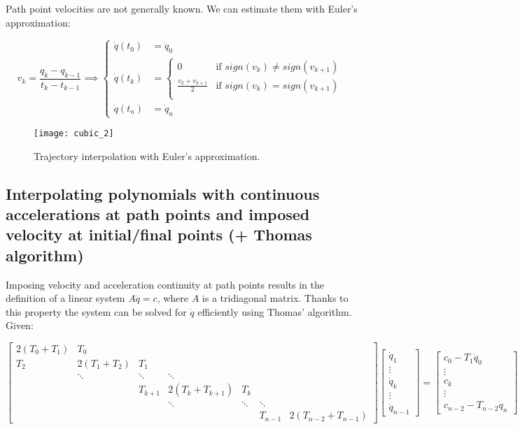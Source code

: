 Path point velocities are not generally known. We can estimate them with Euler's approximation:

\begin{equation*}
v_k = \frac{q_k-q_{k-1}}{t_k-t_{k-1}}\implies\begin{cases}
\dot q(t_0)&=\dot q_0\\
\dot q(t_k)&=\begin{cases}
0 & \text{if }sign(v_k)\neq sign(v_{k+1})\\
\frac{v_k+v_{k+1}}{2} &  \text{if }sign(v_k) =  sign(v_{k+1})\\
\end{cases}\\
\dot q(t_n) &= \dot q_n
\end{cases}
\end{equation*}

\begin{figure}[h]
\centering
\texttt{[image: cubic\_2]}
\caption{Trajectory interpolation with Euler's approximation.}
\end{figure}

\newpage

\subsection{Interpolating polynomials with continuous accelerations at path points and imposed velocity at initial/final points (+ Thomas algorithm)}


Imposing velocity and acceleration continuity at path points results in the definition of a linear system $A\dot q=c$, where $A$ is a tridiagonal matrix. Thanks to this property the system can be solved for $\dot q$ efficiently using Thomas' algorithm. Given:

\begin{equation*}
\begin{bmatrix}
2(T_0+T_1) & T_0 &  &\\
T_2 & 2(T_1+T_2) & T_1 &  & \\
 & \ddots & \ddots & \ddots &  & \\
& & T_{k+1} & 2(T_k+T_{k+1}) & T_k &  & \\
& & & \ddots & \ddots & \ddots &  \\
& & & & & T_{n-1} & 2(T_{n-2} + T_{n-1})
\end{bmatrix}\begin{bmatrix}
\dot q_1\\\vdots\\\dot  q_k\\\vdots \\ \dot q_{n-1}
\end{bmatrix}=\begin{bmatrix}
c_0-T_1\dot q_0\\\vdots\\ c_k\\\vdots \\ c_{n-2}-T_{n-2}\dot q_n
\end{bmatrix}
\end{equation*}

